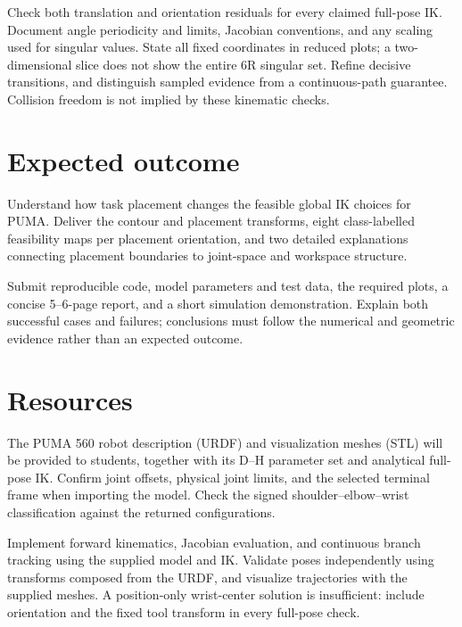 \documentclass[11pt,a4paper]{article}
\begin{document}
Check both translation and orientation residuals
for every claimed full-pose IK. Document angle periodicity and limits,
Jacobian conventions, and any scaling used for singular values. State all
fixed coordinates in reduced plots; a two-dimensional slice does not show
the entire 6R singular set. Refine decisive transitions, and distinguish
sampled evidence from a continuous-path guarantee. Collision freedom is
not implied by these kinematic checks.

\section*{Expected outcome}
Understand how task placement changes the feasible global IK choices
for PUMA. Deliver the contour and placement transforms, eight class-labelled
feasibility maps per placement orientation, and two detailed explanations
connecting placement boundaries to joint-space and workspace structure.

Submit reproducible code, model parameters and test data, the required plots,
a concise 5--6-page report, and a short simulation demonstration. Explain
both successful cases and failures; conclusions must follow the numerical
and geometric evidence rather than an expected outcome.

\section*{Resources}
The PUMA 560 robot description (URDF) and visualization meshes (STL)
will be provided to students, together with its D--H parameter set and
analytical full-pose IK. Confirm joint offsets, physical joint limits, and the
selected terminal frame when importing the model. Check the signed
shoulder--elbow--wrist classification against the returned configurations.

Implement forward kinematics, Jacobian evaluation, and continuous branch
tracking using the supplied model and IK. Validate poses independently using
transforms composed from the URDF, and visualize trajectories with the
supplied meshes. A position-only wrist-center solution is insufficient:
include orientation and the fixed tool transform in every full-pose check.
\end{document}
